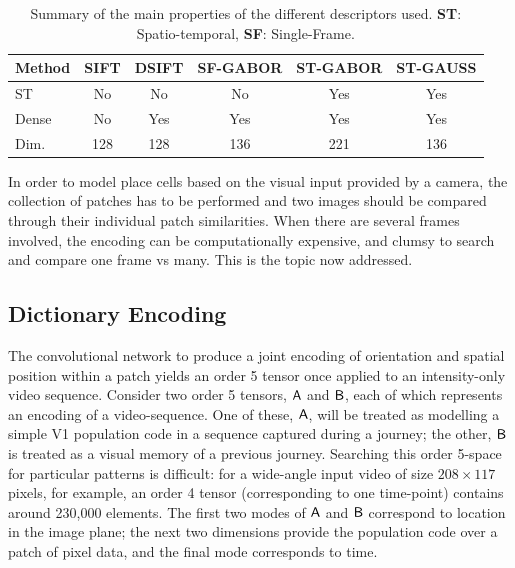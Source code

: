\begin{table}
\centering
   \begin{tabular}{lccccc}
    Method          & SIFT & DSIFT & SF-GABOR & ST-GABOR & ST-GAUSS \\ \hline
    ST			   & No   & No    & No       & Yes      & Yes      \\ \hline
    Dense           & No   & Yes   & Yes      & Yes      & Yes      \\ \hline
    Dim.       & 128  & 128   & 136      & 221      & 136      \\
    \end{tabular}
\caption{Summary of the main properties of the different descriptors used. \textbf{ST}: Spatio-temporal, \textbf{SF}: Single-Frame.}
\label{tab:methods}

\end{table}



In order to model place cells based on the visual input provided by a camera, the collection of patches has to be performed and two images should be compared through their individual patch similarities. When there are several frames involved, the encoding can be computationally expensive, and clumsy to search and compare one frame vs many.  This is the topic now addressed.

\subsection{Dictionary Encoding}
The convolutional network to produce a joint encoding of orientation and spatial position within a patch yields an order 5 tensor once applied to an intensity-only video sequence.  Consider two order 5 tensors, $\mathsf{A}$ and $\mathsf{B}$, each of which represents an encoding of a video-sequence.  One of these, $\mathsf{A}$, will be treated as modelling a simple V1 population code in a sequence captured during a journey; the other, $\mathsf{B}$ is treated as a visual memory of a previous journey.  Searching this order 5-space for particular patterns is difficult: for a wide-angle input video of size $208\times117$ pixels, for example, an order 4 tensor (corresponding to one time-point) contains around 230,000 elements.  The first two modes of $\mathsf{A}$ and $\mathsf{B}$ correspond to location in the image plane; the next two dimensions provide the population code over a patch of pixel data, and the final mode corresponds to time.  


